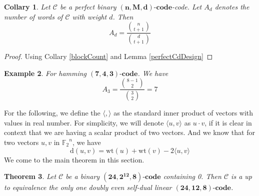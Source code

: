 \documentclass{article}
\newtheorem{theorem}{Theorem}[section]
\newtheorem{example}[theorem]{Example}
\newtheorem{collary}[theorem]{Collary}
\numberwithin{equation}{theorem}
\newcommand{\cCodes}{\ensuremath{\mathscr{C}}}
\newcommand{\code}[3]{\ensuremath{\bm{(#1,#2,#3)\mbox{-}code}}}
\newcommand{\linearCode}[3]{\ensuremath{\bm{(#1,#2,#3)\mbox{-}code}}}
\newcommand{\ftwoN}[1]{\ensuremath{\mathbb{F}_2}^{#1}}
\newcommand{\wt}[1]{\ensuremath{\text{wt}(#1)}}
\newcommand{\dist}[2]{\ensuremath{\text{d}(#1,#2)}}
\begin{document}
\begin{collary}\label{perfectCodeAd}
Let {\cCodes} be a perfect binary \code{n}{M}{d}-code. Let $A_d$ denotes the number of words of {\cCodes} with weight $d$. Then
\[
	A_d = \frac{\binom{n}{t+1}}{\binom{d}{t+1}}
\]
\end{collary}
\begin{proof}
	Using Collary \ref{blockCount}  and Lemma \ref{perfectCdDesign}
\end{proof}
\begin{example}
For hamming \linearCode{7}{4}{3}. We have
\[
	A_3 = \frac{\binom{8-1}{2}}{\binom{3}{2}} = 7
\]
\end{example}
For the following, we define the $\langle , \rangle$ as the standard inner product of vectors with values in real number. 
For simplicity, we will denote $\langle u,v \rangle$ as $u \cdot v$, if it is clear in context that we are having a scalar product of two vectors. And we know that for two vectors $u,v$ in $\ftwoN{n}$, we have
\begin{equation}\label{distWeightEqn}
	\dist{u}{v} = \wt{u} + \wt{v} - 2\langle u, v\rangle 
\end{equation}
We come to the main theorem in this section.
\begin{theorem}
Let {\cCodes} be a binary {\code{24}{2^{12}}{8}} containing 0. Then {\cCodes} is a up to equivalence the only one doubly even self-dual linear {\linearCode{24}{12}{8}}. 
\end{theorem}
\end{document}
